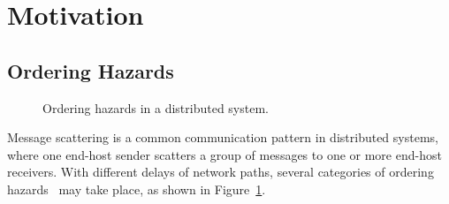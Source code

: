\section{Motivation}
\label{sec:motivation}

\subsection{Ordering Hazards}
\label{subsec:tso}


\begin{figure}[t]
\centering
    \hspace{0.01\textwidth}
    \hspace{0.01\textwidth}
	\caption{Ordering hazards in a distributed system.}
	\label{fig:ordering}
	\vspace{-1.5em}
\end{figure}


Message scattering is a common communication pattern in distributed systems, where one end-host sender scatters a group of messages to one or more end-host receivers.
With different delays of network paths, several categories of ordering hazards~\cite{gharachorloo1990memory,sewell2010x86} may take place, as shown in Figure~\ref{fig:ordering}.

